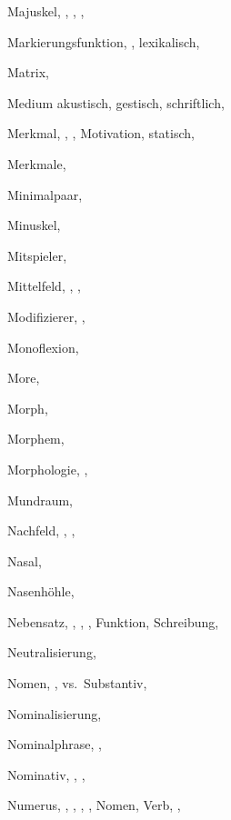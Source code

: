 \begin{theindex}
  \indexspace

  \item Majuskel, , , , 
  \item Markierungsfunktion, , 
    \subitem lexikalisch, 
  \item Matrix, 
  \item Medium
    \subitem akustisch, 
    \subitem gestisch, 
    \subitem schriftlich, 
  \item Merkmal, , , 
    \subitem Motivation, 
    \subitem statisch, 
  \item Merkmale, 
  \item Minimalpaar, 
  \item Minuskel, 
  \item Mitspieler, 
  \item Mittelfeld, , , 
  \item Modifizierer, , 
  \item Monoflexion, 
  \item More, 
  \item Morph, 
  \item Morphem, 
  \item Morphologie, , 
  \item Mundraum, 

  \indexspace

  \item Nachfeld, , , 
  \item Nasal, 
  \item Nasenhöhle, 
  \item Nebensatz, , , , 
    \subitem Funktion, 
    \subitem Schreibung, 
  \item Neutralisierung, 
  \item Nomen, , 
    \subitem vs.\ Substantiv, 
  \item Nominalisierung, 
  \item Nominalphrase, , 
  \item Nominativ, , , 
  \item Numerus, , , , 
		, 
    \subitem Nomen, 
    \subitem Verb, , 


\end{theindex}
